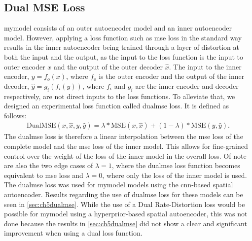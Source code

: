 \subsection{Dual MSE Loss}
\ac{mymodel} consists of an outer autoencoder model and an inner autoencoder model. However, applying a loss function such as \ac{mse} loss in the standard way results in the inner autoencoder being trained through a layer of distortion at both the input and the output, as the input to the loss function is the input to outer encoder $x$ and the output of the outer decoder $\hat{x}$. The input to the inner encoder, $y=f_o(x)$, where $f_o$ is the outer encoder and the output of the inner decoder, $\hat{y}=g_i(f_i(y))$, where $f_i$ and $g_i$ are the inner encoder and decoder respectively, are not direct inputs to the loss functions. To alleviate that, we designed an experimental loss function called \ac{dualmse} loss. It is defined as follows:
\begin{align}
\text{DualMSE}(x,\hat{x},y,\hat{y}) = \lambda * \text{MSE}(x,\hat{x}) + (1-\lambda) *  \text{MSE}(y,\hat{y}).
\end{align}
The \ac{dualmse} loss is therefore a linear interpolation between the \ac{mse} loss of the complete model and the \ac{mse} loss of the inner model. This allows for fine-grained control over the weight of the loss of the inner model in the overall loss. Of note are also the two edge cases of $\lambda = 1$, where the \ac{dualmse} loss function becomes equivalent to \ac{mse} loss and $\lambda = 0$, where only the loss of the inner model is used. The \ac{dualmse} loss was used for \ac{mymodel} models using the \ac{cnn}-based spatial autoencoder. Results regarding the use of \ac{dualmse} loss for these models can be seen in \autoref{sec:ch5dualmse}. While the use of a Dual Rate-Distortion loss would be possible for \ac{mymodel} using a hyperprior-based spatial autoencoder, this was not done because the results in \autoref{sec:ch5dualmse} did not show a clear and significant improvement when using a dual loss function.

